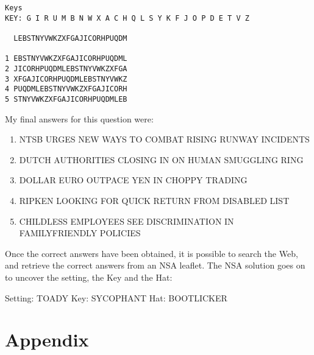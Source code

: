 \documentclass[11pt,a4paper,twoside]{article}
\begin{document}
\begin{lstlisting}
Keys 
KEY: G I R U M B N W X A C H Q L S Y K F J O P D E T V Z

  LEBSTNYVWKZXFGAJICORHPUQDM

1 EBSTNYVWKZXFGAJICORHPUQDML
2 JICORHPUQDMLEBSTNYVWKZXFGA
3 XFGAJICORHPUQDMLEBSTNYVWKZ
4 PUQDMLEBSTNYVWKZXFGAJICORH
5 STNYVWKZXFGAJICORHPUQDMLEB
\end{lstlisting}

My final answers for this question were: 


\begin{enumerate}[noitemsep]
\item NTSB URGES NEW WAYS TO COMBAT RISING RUNWAY INCIDENTS
\item DUTCH AUTHORITIES CLOSING IN ON HUMAN SMUGGLING RING
\item DOLLAR EURO OUTPACE YEN IN CHOPPY TRADING
\item RIPKEN LOOKING FOR QUICK RETURN FROM DISABLED LIST
\item CHILDLESS EMPLOYEES SEE DISCRIMINATION IN FAMILYFRIENDLY POLICIES
\end{enumerate}

Once the correct answers have been obtained, it is possible to search the Web,
and retrieve the correct answers from an NSA leaflet. The NSA solution goes on
to uncover the setting, the Key and the Hat: 

Setting: TOADY Key: SYCOPHANT Hat: BOOTLICKER



%
%
%

\vfill
\pagebreak
\section*{Appendix} 
\appendix 
\end{document}

